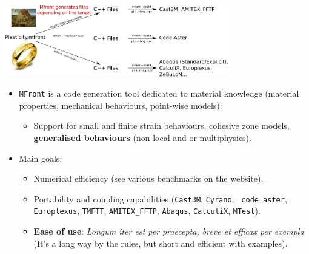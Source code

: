 \documentclass{beamer}
\begin{document}
\begin{frame}
  \begin{center}
    \includegraphics[trim = .01cm .0cm .01cm .0cm,clip,width=0.73\textwidth]{img/MFrontPrinciple.pdf}
    \vspace*{-0.2cm}
  \end{center}
  \begin{itemize}
    \item {\tt MFront} is a code generation tool dedicated to
    material knowledge (material properties, mechanical behaviours,
    point-wise models):
    \begin{itemize}
      \item Support for small and finite strain behaviours,
      cohesive zone models, {\bf generalised behaviours} (non local and
      or multiphysics).
    \end{itemize}
    \item Main goals:
    \begin{itemize} 
      \item Numerical efficiency (see various benchmarks on
      the website).
      \item Portability and coupling capabilities ({\tt Cast3M}, {\tt Cyrano}, {\tt
        code\_aster}, {\tt Europlexus}, {\tt TMFTT}, {\tt AMITEX\_FFTP},
      {\tt Abaqus}, {\tt CalculiX}, {\tt MTest}).
      \item {\bf Ease of use}: {\em Longum iter est per
        praecepta, breve et efficax per exempla} (It's a long way by the
      rules, but short and efficient with examples).
    \end{itemize}
  \end{itemize}
\end{frame}
\end{document}
